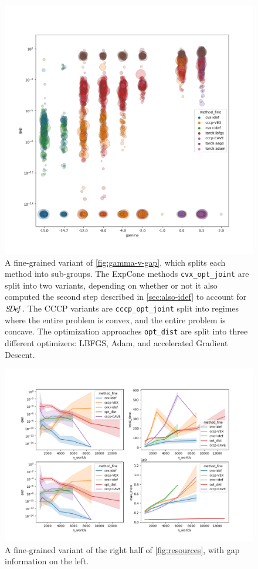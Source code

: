 \documentclass{article}
\begin{document}
\begin{figure}
    \includegraphics[width=\linewidth]{figs/2}
    \caption{
        A fine-grained variant of \cref{fig:gamma-v-gap}, which splits each method into sub-groups.
        The ExpCone methods \texttt{cvx\_opt\_joint} are split into two variants, depending on whether or not it also computed the second step described in \cref{sec:also-idef} to account for $\mathit{S\mskip-3.5muD\mskip-2.5mue\mskip-1.5muf}_{}$.
        The CCCP variants are \texttt{cccp\_opt\_joint} split into regimes where the entire problem is convex, and the entire problem is concave. The optimization approaches \texttt{opt\_dist} are split into three different optimizers: LBFGS, Adam, and accelerated Gradient Descent.
    }\label{fig:gamma-v-gap-fine}
\end{figure}

\begin{figure}
    \includegraphics[width=\linewidth]{figs/1}
    \caption{
        A fine-grained variant of the right half of \cref{fig:resources},
        with gap information on the left.
    }\label{fig:gap-resource-fine}
\end{figure}
\end{document}
